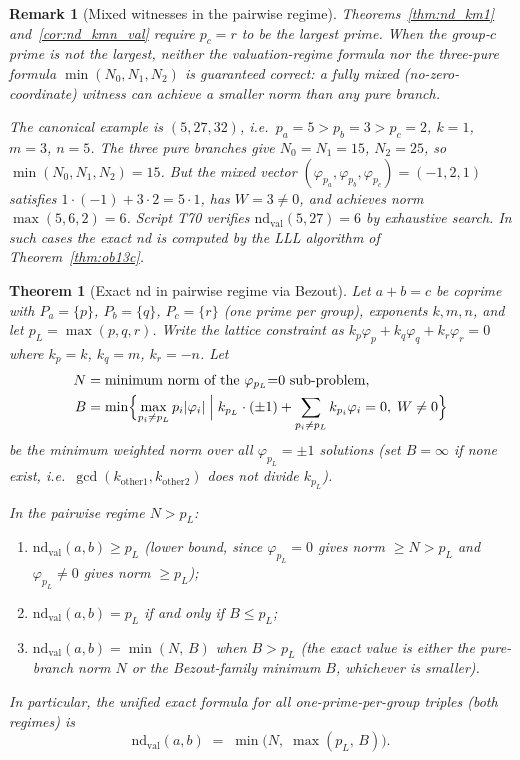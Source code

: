 \documentclass[12pt]{article}
\newtheorem{theorem}{Theorem}
\newtheorem{remark}{Remark}
\theoremstyle{definition}
\begin{document}
\begin{remark}[Mixed witnesses in the pairwise regime]
\label{rem:mixed_witness}
  Theorems~\ref{thm:nd_km1} and~\ref{cor:nd_kmn_val} require $p_c = r$ to be
  the \emph{largest} prime.  When the group-$c$ prime is \emph{not} the largest,
  neither the valuation-regime formula nor the three-pure formula
  $\min(N_0, N_1, N_2)$ is guaranteed correct: a fully mixed (no-zero-coordinate)
  witness can achieve a smaller norm than any pure branch.

  The canonical example is $(5, 27, 32)$, i.e.\
  $p_a = 5 > p_b = 3 > p_c = 2$, $k=1$, $m=3$, $n=5$.
  The three pure branches give $N_0 = N_1 = 15$, $N_2 = 25$,
  so $\min(N_0,N_1,N_2) = 15$.  But the mixed vector
  $(\varphi_{p_a}, \varphi_{p_b}, \varphi_{p_c}) = (-1, 2, 1)$
  satisfies $1 \cdot (-1) + 3 \cdot 2 = 5 \cdot 1$, has $W = 3 \ne 0$,
  and achieves norm $\max(5, 6, 2) = 6$.
  Script T70 verifies $\mathrm{nd}_{\mathrm{val}}(5, 27) = 6$ by exhaustive search.
  In such cases the exact nd is computed by the LLL algorithm of
  Theorem~\ref{thm:ob13c}.
\end{remark}

\begin{theorem}[Exact nd in pairwise regime via Bezout]\label{thm:nd_pairwise_bezout}
  Let $a + b = c$ be coprime with $P_a = \{p\}$, $P_b = \{q\}$, $P_c = \{r\}$
  (one prime per group), exponents $k,m,n$, and let $p_L = \max(p,q,r)$.
  Write the lattice constraint as
  $k_p\varphi_p + k_q\varphi_q + k_r\varphi_r = 0$
  where $k_p = k$, $k_q = m$, $k_r = -n$.
  Let
  \begin{align*}
    N &= \text{minimum norm of the }\varphi_{p_L}{=}0\text{ sub-problem},\\
    B &= \min\Bigl\{\max_{p_i \ne p_L} p_i|\varphi_i| \Bigm|
         k_{p_L} \cdot (\pm 1) + \sum_{p_i \ne p_L} k_{p_i}\varphi_i = 0,\;
         W \ne 0\Bigr\}
  \end{align*}
  be the minimum weighted norm over all $\varphi_{p_L} = \pm 1$ solutions
  (set $B = \infty$ if none exist, i.e.\ $\gcd(k_{\text{other}1}, k_{\text{other}2})$
  does not divide $k_{p_L}$).

  In the pairwise regime $N > p_L$:
  \begin{enumerate}
    \item[(i)] $\mathrm{nd}_{\mathrm{val}}(a,b) \ge p_L$ (lower bound, since
      $\varphi_{p_L}=0$ gives norm $\ge N > p_L$ and
      $\varphi_{p_L}\ne 0$ gives norm $\ge p_L$);
    \item[(ii)] $\mathrm{nd}_{\mathrm{val}}(a,b) = p_L$ if and only if $B \le p_L$;
    \item[(iii)] $\mathrm{nd}_{\mathrm{val}}(a,b) = \min(N,\, B)$ when $B > p_L$
      (the exact value is either the pure-branch norm $N$
      or the Bezout-family minimum $B$, whichever is smaller).
  \end{enumerate}
  In particular, the \emph{unified exact formula} for all one-prime-per-group
  triples (both regimes) is
  \[
    \mathrm{nd}_{\mathrm{val}}(a,b) \;=\; \min\!\bigl(N,\; \max(p_L,\, B)\bigr).
  \]
\end{theorem}
\end{document}
